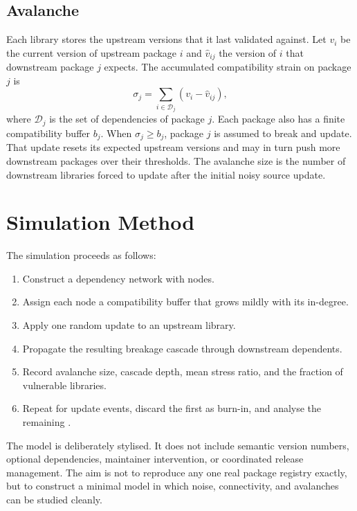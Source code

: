 \documentclass[11pt]{article}
\begin{document}
\subsection{Avalanche}
Each library stores the upstream versions that it last validated against. Let $v_i$ be the current version of upstream package $i$ and $\hat{v}_{ij}$ the version of $i$ that downstream package $j$ expects. The accumulated compatibility strain on package $j$ is
\begin{equation}
\sigma_j = \sum_{i \in \mathcal{D}_j} (v_i - \hat{v}_{ij}),
\end{equation}
where $\mathcal{D}_j$ is the set of dependencies of package $j$. Each package also has a finite compatibility buffer $b_j$. When $\sigma_j \geq b_j$, package $j$ is assumed to break and update. That update resets its expected upstream versions and may in turn push more downstream packages over their thresholds. The avalanche size is the number of downstream libraries forced to update after the initial noisy source update.

\section{Simulation Method}
The simulation proceeds as follows:

\begin{enumerate}[leftmargin=1.4em]
\item Construct a dependency network with \NodeCount{} nodes.
\item Assign each node a compatibility buffer that grows mildly with its in-degree.
\item Apply one random update to an upstream library.
\item Propagate the resulting breakage cascade through downstream dependents.
\item Record avalanche size, cascade depth, mean stress ratio, and the fraction of vulnerable libraries.
\item Repeat for \TotalSteps{} update events, discard the first \BurnIn{} as burn-in, and analyse the remaining \RecordedShocks{}.
\end{enumerate}

The model is deliberately stylised. It does not include semantic version numbers, optional dependencies, maintainer intervention, or coordinated release management. The aim is not to reproduce any one real package registry exactly, but to construct a minimal model in which noise, connectivity, and avalanches can be studied cleanly.
\end{document}
